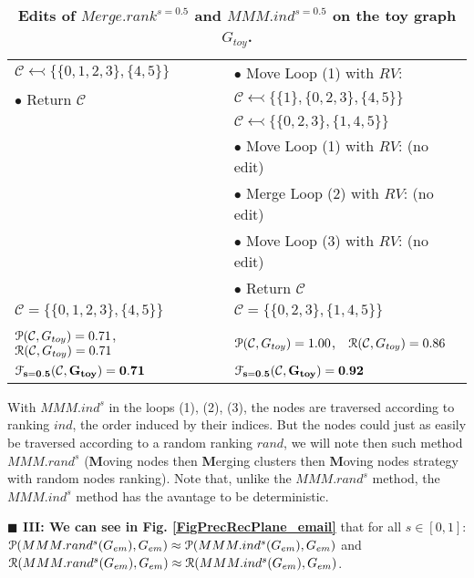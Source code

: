\documentclass[12pt]{article}
\theoremstyle{thmstyleone}%
\theoremstyle{definition}
\begin{document}
\begin{table}[!ht]
\begin{tabular}{| l | l |}
\hspace{0.5cm} $\mathcal{C}\leftarrowtail\big\{\{0,1,2,3\}, \{4,5\}\big\}$ & $\bullet$ Move Loop (1) with $RV$:\\

$\bullet$ Return $\mathcal{C}$ & \hspace{0.5cm} $\mathcal{C}\leftarrowtail\big\{\{1\}, \{0,2,3\}, \{4,5\}\big\}$ \color{red}{[c]}\\

& \hspace{0.5cm} $\mathcal{C}\leftarrowtail\big\{\{0,2,3\}, \{1, 4,5\}\big\}$ \color{red}{[d]}\\
                              & $\bullet$ Move Loop (1) with $RV$: (no edit)\\
                              & $\bullet$ Merge Loop (2) with $RV$: (no edit)\\
                              & $\bullet$ Move Loop (3) with $RV$: (no edit)\\
                              & $\bullet$ Return $\mathcal{C}$\\
\hline
$\mathcal{C}=\big\{\{0,1,2,3\}, \{4,5\}\big\}$ & $\mathcal{C}=\big\{\{0,2,3\}, \{1,4,5\}\big\}$\\
$\EuScript{P}(\mathcal{C},G_{toy})=0.71$, $~$
$\EuScript{R}(\mathcal{C},G_{toy})=0.71$
&
$\EuScript{P}(\mathcal{C}, G_{toy})=1.00$, $~$
$\EuScript{R}(\mathcal{C}, G_{toy})=0.86$\\

$\bf \EuScript{F}_{s=0.5}(\mathcal{C}, G_{toy})=0.71$
&
$\bf \EuScript{F}_{s=0.5}(\mathcal{C}, G_{toy})=0.92$\\
\hline
\end{tabular}
    \caption{{\bf Edits of $Merge.rank^{s=0.5}$ and $MMM.ind^{s=0.5}$ on the toy graph $G_{toy}$.}\label{tigraph}}
\end{table}
\normalsize

\newpage

With $MMM.ind^{s}$ in the loops (1), (2), (3), the nodes are traversed according to ranking $ind$, the order induced by their indices.
But the nodes could just as easily be traversed according to a random ranking  $rand$, we will note then such method $MMM.rand^{s}$ ({\bf M}oving nodes then  {\bf M}erging clusters then {\bf M}oving nodes strategy with random nodes ranking).
Note that, unlike the $MMM.rand^{s}$ method, the $MMM.ind^{s}$ method has the avantage to be deterministic.

\noindent
{\bf $\blacksquare$ III: We can see in Fig. \ref{FigPrecRecPlane_email}} that for all $s\in [0,1]$:
$\EuScript{P}(MMM.rand^{s}(G_{em}), G_{em}) \approx \EuScript{P}(MMM.ind^{s}(G_{em}), G_{em})$ and $\EuScript{R}(MMM.rand^{s}(G_{em}), G_{em}) \approx \EuScript{R}(MMM.ind^{s}(G_{em}), G_{em})$.
\end{document}
